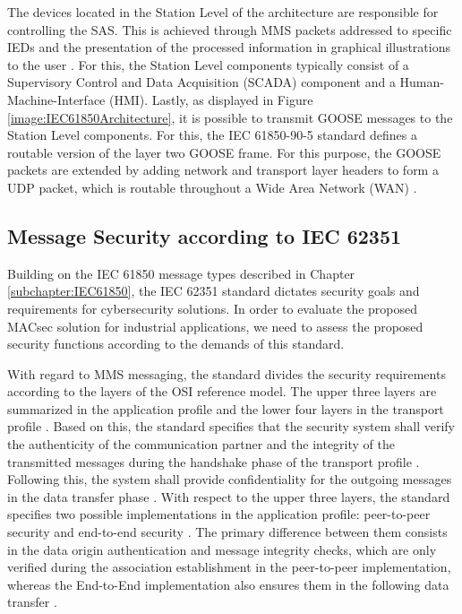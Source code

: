 \documentclass[conference, onecolumn, a4paper]{IEEEtran}
\begin{document}
\smallskip
The devices located in the Station Level of the architecture are responsible for controlling the SAS. This is achieved through MMS packets addressed 
to specific IEDs and the presentation of the processed information in graphical illustrations to the user \cite{SGRWin_IEC61850Architecture:2021}. 
For this, the Station Level components typically consist of a Supervisory Control and Data Acquisition (SCADA) component and a Human-Machine-Interface 
(HMI). Lastly, as displayed in Figure \ref{image:IEC61850Architecture}, it is possible to transmit GOOSE messages to the Station Level components. 
For this, the IEC 61850-90-5 standard \cite{IEC61850-90-5:2012} defines a routable version of the layer two GOOSE frame. For this purpose, the GOOSE 
packets are extended by adding network and transport layer headers to form a UDP packet, which is routable throughout a Wide Area Network (WAN) 
\cite{routable_GOOSE_SV:2020}.

\subsection{Message Security according to IEC 62351}
\noindent Building on the IEC 61850 message types described in Chapter \ref{subchapter:IEC61850}, the IEC 62351 standard \cite{IEC62351:2024} dictates 
security goals and requirements for cybersecurity solutions. In order to evaluate the proposed MACsec solution for industrial applications, 
we need to assess the proposed security functions according to the demands of this standard.

\smallskip
With regard to MMS messaging, the standard divides the security requirements according to the layers of the OSI reference model. The upper three layers 
are summarized in the application profile and the lower four layers in the transport profile \cite{SecureMMS:2020}. Based on this, the standard specifies 
that the security system shall verify the authenticity of the communication partner and the integrity of the transmitted messages during the handshake 
phase of the transport profile \cite{Review_IEC62351:2019}. Following this, the system shall provide confidentiality for the outgoing messages in the 
data transfer phase \cite{SecureMMS:2020}. With respect to the upper three layers, the standard specifies two possible implementations in the application 
profile: peer-to-peer security and end-to-end security \cite{Review_IEC62351:2019}. The primary difference between them consists in the data origin 
authentication and message integrity checks, which are only verified during the association establishment in the peer-to-peer implementation, whereas 
the End-to-End implementation also ensures them in the following data transfer \cite{Review_IEC62351:2019}.
\end{document}
